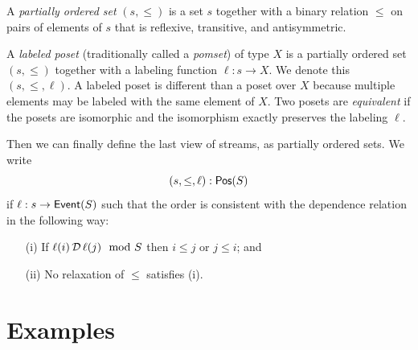 A \emph{partially ordered set} $(s, \le)$ is a set $s$ together with a binary relation $\le$ on pairs of elements of $s$ that is reflexive, transitive, and antisymmetric.

A \emph{labeled poset} (traditionally called a \emph{pomset}) of type $X$ is a
partially ordered set $(s, \le)$ together with a labeling function $\ell: s \to X$. We denote this $(s, \le, \ell)$. A labeled poset is different than a poset over $X$ because multiple elements may be labeled with the same element of $X$.
Two posets are \emph{equivalent} if the posets are isomorphic and the isomorphism exactly preserves the labeling $\ell$.

Then we can finally define the last view of streams, as partially ordered sets.
We write
\[
(s, \le, \ell): \mathsf{Pos}({S})
\]
if $\ell: s \to \mathsf{Event}(S)$ such that the order is consistent with the dependence
relation in the following way:
\begin{enumerate}
\item[(i)] If $\ell(i) \,\mathcal{D}\, \ell(j) \mod {S}$ then $i \le j$ or $j \le i$; and
\item[(ii)] No relaxation of $\le$ satisfies (i).
\end{enumerate}

\section{Examples}

